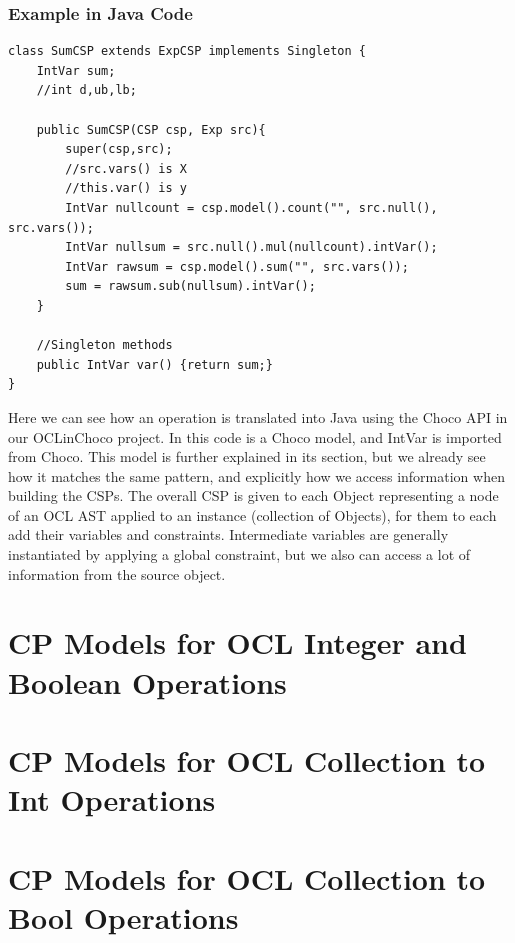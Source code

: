 \subsubsection*{Example in Java Code}
\begin{lstlisting}
class SumCSP extends ExpCSP implements Singleton {
    IntVar sum;
    //int d,ub,lb;

    public SumCSP(CSP csp, Exp src){
        super(csp,src);
        //src.vars() is X
        //this.var() is y
        IntVar nullcount = csp.model().count("", src.null(), src.vars());
        IntVar nullsum = src.null().mul(nullcount).intVar();
        IntVar rawsum = csp.model().sum("", src.vars());
        sum = rawsum.sub(nullsum).intVar();
    }

    //Singleton methods
    public IntVar var() {return sum;}
}
\end{lstlisting}
Here we can see how an operation is translated into Java using the Choco API in our OCLinChoco project. In this code  is a Choco model, and IntVar is imported from Choco. 
This model is further explained in its section, but we already see how it matches the same pattern, and explicitly how we access information when building the CSPs.
The overall CSP is given to each Object representing a node of an OCL AST applied to an instance (collection of Objects), for them to each add their variables and constraints.
Intermediate variables are generally instantiated by applying a global constraint, but we also can access a lot of information from the source object.

\newpage
\section{CP Models for OCL Integer and Boolean Operations}


\newpage
\section{CP Models for OCL Collection to Int Operations}


\newpage
\section{CP Models for OCL Collection to Bool Operations}


\newpage
